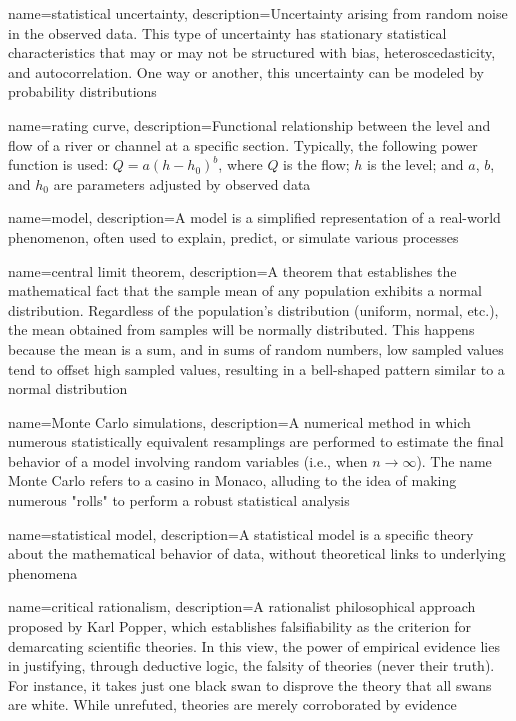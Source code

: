 {
    name=statistical uncertainty,
    description={Uncertainty arising from random noise in the observed data. This type of uncertainty has stationary statistical characteristics that may or may not be structured with bias, heteroscedasticity, and autocorrelation. One way or another, this uncertainty can be modeled by probability distributions}
}

{
    name=rating curve,
    description={Functional relationship between the level and flow of a river or channel at a specific section. Typically, the following power function is used: $Q = a(h - h_0)^b$, where $Q$ is the flow; $h$ is the level; and $a$, $b$, and $h_0$ are parameters adjusted by observed data}
}



{
    name=model,
    description={A model is a simplified representation of a real-world phenomenon, often used to explain, predict, or simulate various processes}
}

{
    name=central limit theorem,
    description={A theorem that establishes the mathematical fact that the sample mean of any population exhibits a normal distribution. Regardless of the population’s distribution (uniform, normal, etc.), the mean obtained from samples will be normally distributed. This happens because the mean is a sum, and in sums of random numbers, low sampled values tend to offset high sampled values, resulting in a bell-shaped pattern similar to a normal distribution}
}

{
    name=Monte Carlo simulations,
    description={A numerical method in which numerous statistically equivalent resamplings are performed to estimate the final behavior of a model involving random variables (i.e., when $n \to \infty$). The name Monte Carlo refers to a casino in Monaco, alluding to the idea of making numerous "rolls" to perform a robust statistical analysis}
}

{
    name=statistical model,
    description={A statistical model is a specific theory about the mathematical behavior of data, without theoretical links to underlying phenomena}
}

{
    name=critical rationalism,
    description={A rationalist philosophical approach proposed by Karl Popper, which establishes falsifiability as the criterion for demarcating scientific theories. In this view, the power of empirical evidence lies in justifying, through deductive logic, the falsity of theories (never their truth). For instance, it takes just one black swan to disprove the theory that all swans are white. While unrefuted, theories are merely corroborated by evidence}
}

